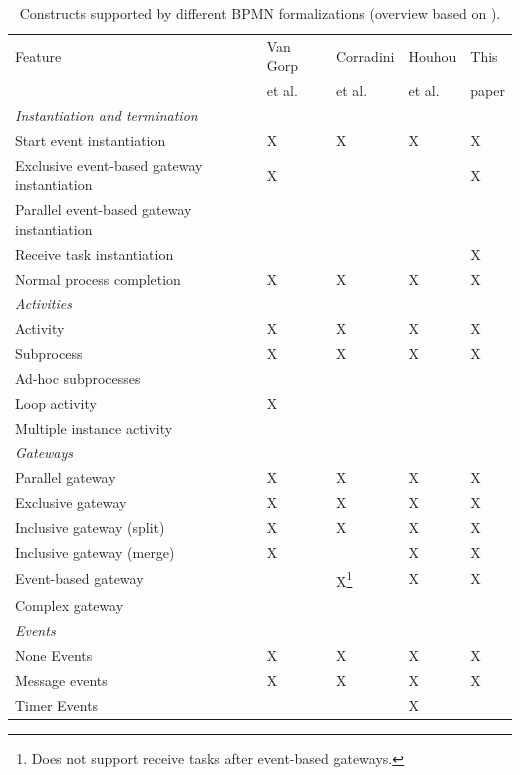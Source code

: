 \documentclass[submission, copyright, creativecommons]{eptcs}
\begin{document}
\begin{table}[htbp]
    \caption{Constructs supported by different BPMN formalizations (overview based on \cite{vangorpVisualTokenbasedFormalization2013}).}
    \label{tab:supportedconstructs}
    \begin{tabular}{l l l l l}
    \hline
      Feature & Van Gorp &  Corradini & Houhou & This\\
      & et al. \cite{vangorpVisualTokenbasedFormalization2013} & et al. \cite{corradiniFormalApproachAnalysis2021}& et al. \cite{houhouFirstOrderLogicVerification2022} & paper\\
      \hline
      \textit{Instantiation and termination} & &\\
      Start event instantiation & X & X & X & X\\
      Exclusive event-based gateway instantiation & X & & & X\\
      Parallel event-based gateway instantiation &  & & & \\
      Receive task instantiation & & & & X\\
      Normal process completion & X & X & X & X\\
      \textit{Activities} & & & &\\
      Activity & X & X & X & X\\
      Subprocess & X & X & X & X\\
      Ad-hoc subprocesses & & & &\\
      Loop activity & X & & &\\
      Multiple instance activity & & & & \\
      \textit{Gateways} & & & &\\
      Parallel gateway & X & X & X & X\\
      Exclusive gateway & X & X & X & X\\
      Inclusive gateway (split) & X & X & X & X\\
      Inclusive gateway (merge) & X & & X & X\\
      Event-based gateway &  & X\footnote{Does not support receive tasks after event-based gateways.} & X & X\\ %
      Complex gateway & & & &\\
      \textit{Events} & & & & \\
      None Events & X & X & X & X\\
      Message events & X & X & X & X\\
      Timer Events & & & X & \\

\end{tabular}
\end{table}
\end{document}
